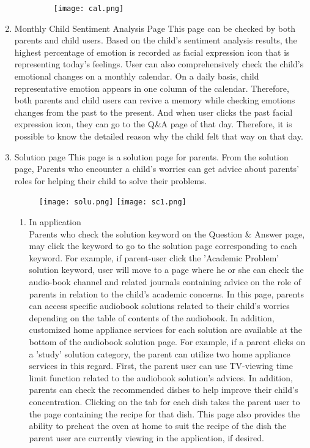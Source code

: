 \documentclass[conference]{IEEEtran}
\begin{document}
\begin{enumerate}
\begin{enumerate}
                \begin{figure}[H]
                 \centering
                 \texttt{[image: cal.png]}
                 \end{figure}
            \end{enumerate}
            \item Monthly Child Sentiment Analysis Page \hfill \break
            This page can be checked by both parents and child users. Based on the child's sentiment analysis results, the highest percentage of emotion is recorded as facial expression icon that is representing today's feelings. User can also comprehensively check the child's emotional changes on a monthly calendar. On a daily basis, child representative emotion appears in one column of the calendar. Therefore, both parents and child users can revive a memory while checking emotions changes from the past to the present. And when user clicks the past facial expression icon, they can go to the Q\&A page of that day. Therefore, it is possible to know the detailed reason why the child felt that way on that day.\\
            \item Solution page \hfill \break
            This page is a solution page for parents. From the solution page, Parents who encounter a child's worries can get advice about parents' roles for helping their child to solve their problems.
            \begin{figure}[H]
                 \centering
                 \texttt{[image: solu.png]}
                 \texttt{[image: sc1.png]}
                 \end{figure}
            \begin{enumerate}
                \item In application\\
                Parents who check the solution keyword on the Question \& Answer page, may click the keyword to go to the solution page corresponding to each keyword. For example, if parent-user click the 'Academic Problem' solution keyword, user will move to a page where he or she can check the audio-book channel and related journals containing advice on the role of parents in relation to the child's academic concerns. In this page, parents can access specific audiobook solutions related to their child's worries depending on the table of contents of the audiobook.
                 In addition, customized home appliance services for each solution are available at the bottom of the audiobook solution page. For example, if a parent clicks on a 'study' solution category, the parent can utilize two home appliance services in this regard. First, the parent user can use TV-viewing time limit function related to the audiobook solution's advices. In addition, parents can check the recommended dishes to help improve their child's concentration. Clicking on the tab for each dish takes the parent user to the page containing the recipe for that dish. This page also provides the ability to preheat the oven at home to suit the recipe of the dish the parent user are currently viewing in the application, if desired.

\end{enumerate}
\end{enumerate}
\end{document}
